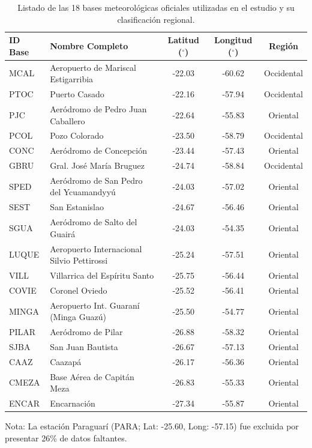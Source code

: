 \documentclass[11pt,a4paper]{article}
\begin{document}
\begin{table}[ht!]
\centering
\begin{threeparttable}
\caption{Listado de las 18 bases meteorológicas oficiales utilizadas en el estudio y su clasificación regional.}
\label{tab:estaciones}
\vspace{-0.4cm}
\singlespacing
\footnotesize
\begin{tabular}{llccc}
\hline\hline
\textbf{ID Base} & \textbf{Nombre Completo} & \textbf{Latitud ($^\circ$)} & \textbf{Longitud ($^\circ$)} & \textbf{Región} \\
\hline
MCAL & Aeropuerto de Mariscal Estigarribia & -22.03 & -60.62 & Occidental \\
PTOC & Puerto Casado & -22.16 & -57.94 & Occidental \\
PJC & Aeródromo de Pedro Juan Caballero & -22.64 & -55.83 & Oriental \\
PCOL & Pozo Colorado & -23.50 & -58.79 & Occidental \\
CONC & Aeródromo de Concepción & -23.44 & -57.43 & Oriental \\
GBRU & Gral. José María Bruguez & -24.74 & -58.84 & Occidental \\
SPED & Aeródromo de San Pedro del Ycuamandyyú & -24.03 & -57.02 & Oriental \\
SEST & San Estanislao & -24.67 & -56.46 & Oriental \\
SGUA & Aeródromo de Salto del Guairá & -24.03 & -54.35 & Oriental \\
LUQUE & Aeropuerto Internacional Silvio Pettirossi & -25.24 & -57.51 & Oriental \\
VILL & Villarrica del Espíritu Santo & -25.75 & -56.44 & Oriental \\
COVIE & Coronel Oviedo & -25.52 & -56.41 & Oriental \\
MINGA & Aeropuerto Int. Guaraní (Minga Guazú) & -25.50 & -54.77 & Oriental \\
PILAR & Aeródromo de Pilar & -26.88 & -58.32 & Oriental \\
SJBA & San Juan Bautista & -26.67 & -57.13 & Oriental \\
CAAZ & Caazapá & -26.17 & -56.36 & Oriental \\
CMEZA & Base Aérea de Capitán Meza & -26.83 & -55.33 & Oriental \\
ENCAR & Encarnación & -27.34 & -55.87 & Oriental \\
\hline\hline
\end{tabular}
\begin{tablenotes}
\item \scriptsize Nota: La estación Paraguarí (PARA; Lat: -25.60, Long: -57.15) fue excluida por presentar 26\% de datos faltantes.
\end{tablenotes}
\end{threeparttable}
\end{table}
\end{document}
